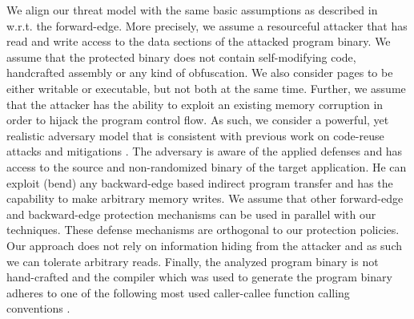 We align our threat model with the same basic assumptions as described in~\cite{veen:typearmor} w.r.t. the forward-edge.
More precisely, we assume a resourceful attacker that has read and write access to the data 
sections of the attacked program binary. We assume that the protected binary does not contain 
self-modifying code, handcrafted assembly or any kind of obfuscation. We also consider pages 
to be either writable or executable, but not both at the same time. Further, we assume 
that the attacker has the ability to exploit an existing memory corruption in order to hijack the program
control flow. 
As such, we consider a powerful, yet realistic adversary
model that is consistent with previous work on code-reuse
attacks and mitigations \cite{volodymyr:cpi}. 
The adversary is aware of the
applied defenses and has access to the source and non-randomized 
binary of the target application.
He can exploit (bend)
any backward-edge based indirect program transfer and
has the capability to make arbitrary memory writes. 
We assume that other forward-edge and backward-edge protection mechanisms
can be used in parallel with our techniques.
These defense
mechanisms are orthogonal to our protection policies. Our
approach does not rely on information hiding from the
attacker and as such we can tolerate arbitrary reads. 
Finally, the analyzed program binary is not hand-crafted and the compiler which was used
to generate the program binary adheres to one of the 
following most used caller-callee function calling conventions \cite{arm:abi, microsoft:abi, itanium:abi}.


